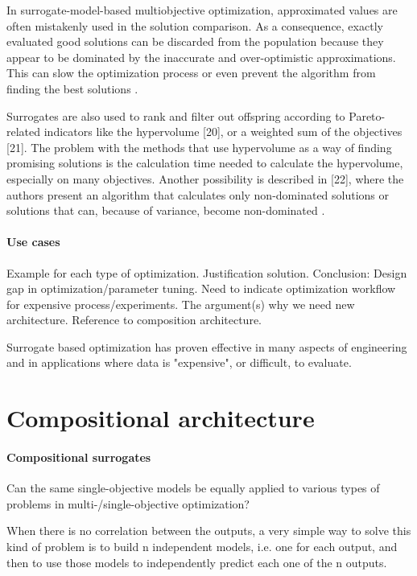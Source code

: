         In surrogate-model-based multiobjective optimization, approximated values are often mistakenly used in the 
        solution comparison. As a consequence, exactly evaluated good solutions can be discarded from the population 
        because they appear to be dominated by the inaccurate and over-optimistic approximations. This can slow the 
        optimization process or even prevent the algorithm from finding the best solutions \cite{MlakarPTF15}.

        Surrogates are also used to rank and filter out offspring according to Pareto-related indicators like the 
        hypervolume [20], or a weighted sum of the objectives [21]. The problem with the methods that use 
        hypervolume as a way of finding promising solutions is the calculation time needed to calculate the 
        hypervolume, especially on many objectives. Another possibility is described in [22], where the authors 
        present an algorithm that calculates only non-dominated solutions or solutions that can, because of variance, 
        become non-dominated \cite{MlakarPTF15}.


        \cite{EngSurMod}        

        \paragraph{Use cases}
        Example for each type of optimization. Justification solution.
        Conclusion: Design gap in optimization/parameter tuning. 
        Need to indicate optimization workflow for expensive process/experiments. 
        The argument(s) why we need new architecture. Reference to composition architecture.

        Surrogate based optimization has proven effective in many aspects of engineering and in applications where data is "expensive", or difficult, to evaluate.


    \section{Compositional architecture}
        \paragraph{Compositional surrogates}
        Can the same single-objective models be equally applied to various types of problems in multi-/single-objective optimization?

        When there is no correlation between the outputs, a very simple way to solve this kind of problem is to build n independent models, i.e. one for each output, 
        and then to use those models to independently predict each one of the n outputs. 

